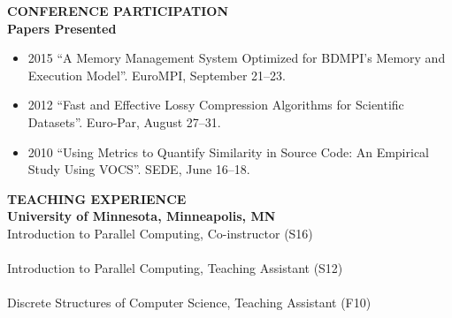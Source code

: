 \documentclass[a4paper,12pt]{article}
\newcommand{\lskip}[1]{\hspace*{1em}\\[#1\baselineskip]}
\newenvironment{Itemize}[0]{
  \vspace{-\parskip}\begin{itemize}
}{
  \end{itemize}
}
\begin{document}
\textbf{CONFERENCE PARTICIPATION}
\lskip{1}
%
\textbf{Papers Presented}
\begin{Itemize}
  \item[2015] ``A Memory Management System Optimized for BDMPI's Memory and
              Execution Model''. EuroMPI, September 21--23.

  \item[2012] ``Fast and Effective Lossy Compression Algorithms for Scientific
              Datasets''. Euro-Par, August 27--31.

  \item[2010] ``Using Metrics to Quantify Similarity in Source Code: An
              Empirical Study Using VOCS''. SEDE, June 16--18.
\end{Itemize}


\textbf{TEACHING EXPERIENCE}
\lskip{1}
%
\textbf{University of Minnesota, Minneapolis, MN}\\
%
Introduction to Parallel Computing, Co-instructor (S16)\\
  \hspace*{1em}{\footnotesize Design and deliver weekly lectures, design and
    grade assignments, and hold office hours.}\\
%
Introduction to Parallel Computing, Teaching Assistant (S12)\\
  \hspace*{1em}{\footnotesize Gave two guest lectures, held office hours, and
    graded assignments.}\\
%
Discrete Structures of Computer Science, Teaching Assistant (F10)\\
  \hspace*{1em}{\footnotesize Lead weekly recitations, held office hours, and
    graded assignments.}\\
%
%
%
%
%
%
\end{document}
